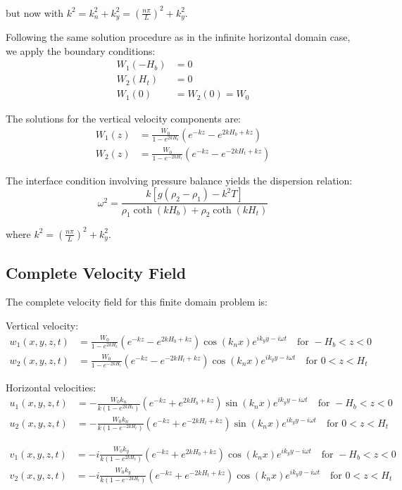 \documentclass[12pt,a4paper]{article}
\begin{document}
but now with $k^2 = k_n^2 + k_y^2 = \left(\frac{n\pi}{L}\right)^2 + k_y^2$.

Following the same solution procedure as in the infinite horizontal domain case, we apply the boundary conditions:
\begin{align}
W_1(-H_b) &= 0 \\
W_2(H_t) &= 0 \\
W_1(0) &= W_2(0) = W_0
\end{align}

The solutions for the vertical velocity components are:
\begin{align}
W_1(z) &= \frac{W_0}{1 - e^{2kH_b}}(e^{-kz} - e^{2kH_b+kz}) \\
W_2(z) &= \frac{W_0}{1 - e^{-2kH_t}}(e^{-kz} - e^{-2kH_t+kz})
\end{align}

The interface condition involving pressure balance yields the dispersion relation:
\begin{equation}
\omega^2 = \frac{k[g(\rho_2 - \rho_1) - k^2T]}{\rho_1\coth(kH_b) + \rho_2\coth(kH_t)}
\end{equation}

where $k^2 = \left(\frac{n\pi}{L}\right)^2 + k_y^2$.

\subsection{Complete Velocity Field}
The complete velocity field for this finite domain problem is:

Vertical velocity:
\begin{align}
w_1(x,y,z,t) &= \frac{W_0}{1-e^{2kH_b}}(e^{-kz}-e^{2kH_b+kz})\cos(k_n x)e^{ik_y y-i\omega t} \quad \text{for } -H_b < z < 0 \\
w_2(x,y,z,t) &= \frac{W_0}{1-e^{-2kH_t}}(e^{-kz}-e^{-2kH_t+kz})\cos(k_n x)e^{ik_y y-i\omega t} \quad \text{for } 0 < z < H_t
\end{align}

Horizontal velocities:
\begin{align}
u_1(x,y,z,t) &= -\frac{W_0 k_n}{k(1-e^{2kH_b})}(e^{-kz}+e^{2kH_b+kz})\sin(k_n x)e^{ik_y y-i\omega t} \quad \text{for } -H_b < z < 0 \\
u_2(x,y,z,t) &= -\frac{W_0 k_n}{k(1-e^{-2kH_t})}(e^{-kz}+e^{-2kH_t+kz})\sin(k_n x)e^{ik_y y-i\omega t} \quad \text{for } 0 < z < H_t
\end{align}

\begin{align}
v_1(x,y,z,t) &= -i\frac{W_0 k_y}{k(1-e^{2kH_b})}(e^{-kz}+e^{2kH_b+kz})\cos(k_n x)e^{ik_y y-i\omega t} \quad \text{for } -H_b < z < 0 \\
v_2(x,y,z,t) &= -i\frac{W_0 k_y}{k(1-e^{-2kH_t})}(e^{-kz}+e^{-2kH_t+kz})\cos(k_n x)e^{ik_y y-i\omega t} \quad \text{for } 0 < z < H_t
\end{align}
\end{document}
